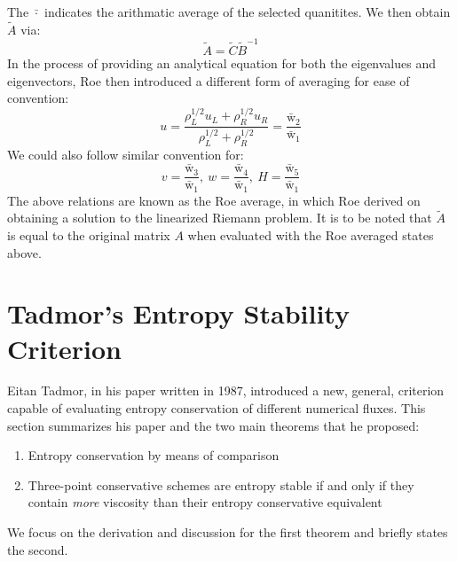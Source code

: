 \documentclass[a4paper]{article}
\numberwithin{equation}{section}
\begin{document}
The $\bar{\cdot}$ indicates the arithmatic average of the selected quanitites. We then obtain $\tilde{A}$ via:
\begin{equation}
    \tilde{A} = \tilde{C}\tilde{B}^{-1}
\end{equation}
In the process of providing an analytical equation for both the eigenvalues and eigenvectors, Roe then introduced a different form of averaging for ease of convention:
\begin{equation}
    u = \frac{\rho^{1/2}_L u_L + \rho^{1/2}_R u_R}{\rho_L^{1/2} + \rho_R^{1/2}} = \frac{\bar{\mathrm{w}}_2}{\bar{\mathrm{w}}_1}
\end{equation}
We could also follow similar convention for:
\begin{equation}
    v = \frac{\bar{\mathrm{w}}_3}{\bar{\mathrm{w}}_1}, \ w = \frac{\bar{\mathrm{w}}_4}{\bar{\mathrm{w}}_1}, \ H = \frac{\bar{\mathrm{w}}_5}{\bar{\mathrm{w}}_1}
\end{equation}
The above relations are known as the Roe average, in which Roe derived on obtaining a solution to the linearized Riemann problem. It is to be noted that $\tilde{A}$ is equal to the original matrix $A$ when evaluated with the Roe averaged states above. 

\section{Tadmor's Entropy Stability Criterion}
Eitan Tadmor, in his paper written in 1987, introduced a new, general, criterion capable of evaluating entropy conservation of different numerical fluxes. This section summarizes his paper and the two main theorems that he proposed:
\begin{enumerate}
    \item Entropy conservation by means of comparison
    \item Three-point conservative schemes are entropy stable if and only if they contain \textit{more} viscosity than their entropy conservative equivalent
\end{enumerate}
We focus on the derivation and discussion for the first theorem and briefly states the second.
\end{document}
